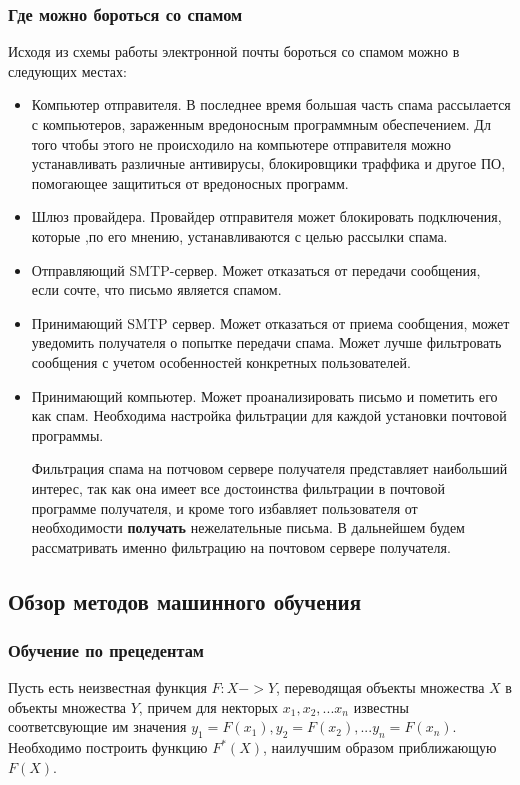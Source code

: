 \subsubsection{Где можно бороться со спамом}
Исходя из схемы работы электронной почты бороться со спамом можно в следующих местах:
\begin{itemize}
\item Компьютер отправителя. В последнее время большая часть спама рассылается с компьютеров, зараженным вредоносным программным обеспечением. Дл того чтобы этого не происходило на компьютере отправителя можно устанавливать различные антивирусы, блокировщики  траффика и другое ПО, помогающее защититься от вредоносных программ.
\item Шлюз провайдера. Провайдер отправителя может блокировать подключения, которые ,по его мнению, устанавливаются с целью рассылки спама.
\item Отправляющий SMTP-сервер. Может отказаться от передачи сообщения, если сочте, что письмо является спамом.
\item Принимающий SMTP сервер. Может отказаться от приема сообщения, может уведомить получателя о попытке передачи спама. Может лучше фильтровать сообщения с учетом особенностей конкретных пользователей.
\item Принимающий компьютер. Может проанализировать письмо и пометить его как спам. Необходима настройка фильтрации для каждой установки почтовой программы.

Фильтрация спама на потчовом сервере получателя представляет наибольший интерес, так как она имеет все достоинства фильтрации в почтовой программе получателя, и кроме того избавляет пользователя от необходимости \textbf{получать} нежелательные письма. В дальнейшем будем рассматривать именно фильтрацию на почтовом сервере получателя.
\end{itemize}

\subsection{Обзор методов машинного обучения} 
\subsubsection{Обучение по прецедентам}
Пусть есть неизвестная функция $F: X -> Y$, переводящая объекты
множества $X$ в объекты множества $Y$, причем для некторых $x_1, x_2, ... x_n$ известны соответсвующие им значения $y_1 = F(x_1), y_2 = F(x_2), ... y_n = F(x_n)$.
Необходимо построить функцию $F^*(X)$, наилучшим образом приближающую $F(X)$.


